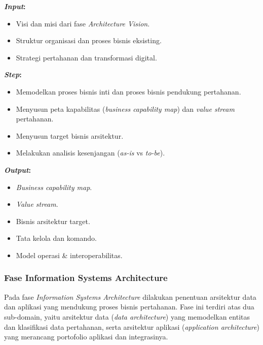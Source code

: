 \textbf{\textit{Input}:}
\begin{itemize}
  \item Visi dan misi dari fase \textit{Architecture Vision}.
  \item Struktur organisasi dan proses bisnis eksisting.
  \item Strategi pertahanan dan transformasi digital.
\end{itemize}
\textbf{\textit{Step}:}
\begin{itemize}
  \item Memodelkan proses bisnis inti dan proses bisnis pendukung pertahanan.
  \item Menyusun peta kapabilitas (\textit{business capability map}) dan \textit{value stream} pertahanan.
  \item Menyusun target bisnis arsitektur.
  \item Melakukan analisis kesenjangan (\textit{as-is} vs \textit{to-be}).
\end{itemize}
\textbf{\textit{Output}:}
\begin{itemize}
  \item \textit{Business capability map}.
  \item \textit{Value stream}.
  \item Bisnis arsitektur target.
  \item Tata kelola dan komando.
  \item Model operasi \& interoperabilitas.
\end{itemize}

\subsubsection{Fase Information Systems Architecture}
Pada fase \textit{Information Systems Architecture} dilakukan penentuan arsitektur data dan aplikasi yang mendukung proses bisnis pertahanan.
Fase ini terdiri atas dua sub-domain, yaitu arsitektur data (\textit{data architecture}) yang memodelkan entitas dan klasifikasi data pertahanan, serta arsitektur aplikasi (\textit{application architecture}) yang merancang portofolio aplikasi dan integrasinya.

